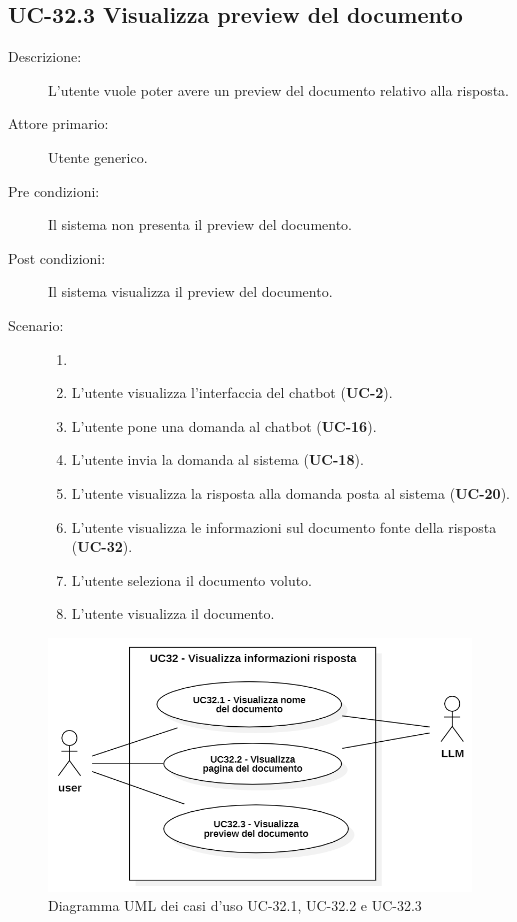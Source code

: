\subsection{UC-32.3 Visualizza preview del documento}
\begin{description}
    \item[Descrizione:] L'utente vuole poter avere un preview del documento relativo alla risposta.
    \item[Attore primario:] Utente generico.
    \item[Pre condizioni:] Il sistema non presenta il preview del documento.
    \item[Post condizioni:] Il sistema visualizza il preview del documento.
    \item[Scenario:] 
    \begin{enumerate}
        \item[] 
        \item L’utente visualizza l'interfaccia del chatbot (\textbf{UC-2}).
        \item L’utente pone una domanda al chatbot (\textbf{UC-16}).
        \item L'utente invia la domanda al sistema (\textbf{UC-18}).
        \item L'utente visualizza la risposta alla domanda posta al sistema (\textbf{UC-20}).
        \item L'utente visualizza le informazioni sul documento fonte della risposta (\textbf{UC-32}).
        \item L'utente seleziona il documento voluto. 
        \item L'utente visualizza il documento.
    \end{enumerate}
\end{description}

\begin{figure}[H]
    \centering
    \includegraphics[width=0.9\linewidth]{UC32.1-2-3.PNG}
    \caption{Diagramma UML dei casi d'uso UC-32.1, UC-32.2 e UC-32.3}
    \label{fig:UC32.1-2-3}
\end{figure}

